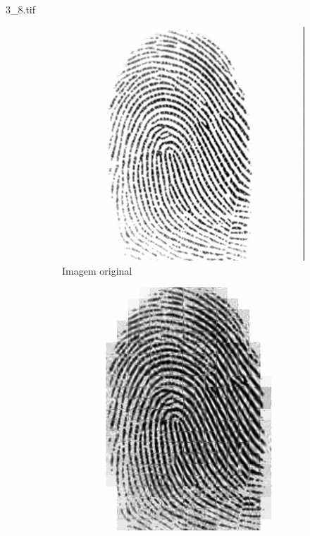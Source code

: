 \documentclass{beamer}
\begin{document}
    \begin{frame}{3\_8.tif}
        \begin{figure}
            \centering
            \begin{subfigure}[!ht]{0.32\textwidth}
                \includegraphics[width=\columnwidth]{Fingerprints/3_8.jpg}
                \caption{Imagem original}
            \end{subfigure}
            \begin{subfigure}[!ht]{0.32\textwidth}
                \includegraphics[width=\columnwidth]{Fingerprints/3_8_intermediate.jpg}

\end{subfigure}
\end{figure}
\end{frame}
\end{document}

